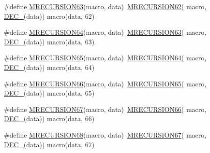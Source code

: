 \begin{DoxyCompactItemize}
\item 
\#define \mbox{\hyperlink{group__group__sam0__utils__mrecursion_gacb4f4ed0c1f5953daf02b6887354c2f4}{M\+R\+E\+C\+U\+R\+S\+I\+O\+N63}}(macro,  data)~\mbox{\hyperlink{group__group__sam0__utils__mrecursion_ga6e6d5152fa7a0cb287f6df4c79043ef1}{M\+R\+E\+C\+U\+R\+S\+I\+O\+N62}}(  macro, \mbox{\hyperlink{group__group__sam0__utils__mrecursion_ga1d23d683797679dca8c3512a54a5dcae}{D\+E\+C\+\_\+}}(data))   macro(data, 62)
\item 
\#define \mbox{\hyperlink{group__group__sam0__utils__mrecursion_gada0aad0d480e150d9fd5621e3769f397}{M\+R\+E\+C\+U\+R\+S\+I\+O\+N64}}(macro,  data)~\mbox{\hyperlink{group__group__sam0__utils__mrecursion_gacb4f4ed0c1f5953daf02b6887354c2f4}{M\+R\+E\+C\+U\+R\+S\+I\+O\+N63}}(  macro, \mbox{\hyperlink{group__group__sam0__utils__mrecursion_ga1d23d683797679dca8c3512a54a5dcae}{D\+E\+C\+\_\+}}(data))   macro(data, 63)
\item 
\#define \mbox{\hyperlink{group__group__sam0__utils__mrecursion_ga559cd98b41f57003d86b982477bad6bb}{M\+R\+E\+C\+U\+R\+S\+I\+O\+N65}}(macro,  data)~\mbox{\hyperlink{group__group__sam0__utils__mrecursion_gada0aad0d480e150d9fd5621e3769f397}{M\+R\+E\+C\+U\+R\+S\+I\+O\+N64}}(  macro, \mbox{\hyperlink{group__group__sam0__utils__mrecursion_ga1d23d683797679dca8c3512a54a5dcae}{D\+E\+C\+\_\+}}(data))   macro(data, 64)
\item 
\#define \mbox{\hyperlink{group__group__sam0__utils__mrecursion_gae1bc9072af8c0a3690822abcf9100937}{M\+R\+E\+C\+U\+R\+S\+I\+O\+N66}}(macro,  data)~\mbox{\hyperlink{group__group__sam0__utils__mrecursion_ga559cd98b41f57003d86b982477bad6bb}{M\+R\+E\+C\+U\+R\+S\+I\+O\+N65}}(  macro, \mbox{\hyperlink{group__group__sam0__utils__mrecursion_ga1d23d683797679dca8c3512a54a5dcae}{D\+E\+C\+\_\+}}(data))   macro(data, 65)
\item 
\#define \mbox{\hyperlink{group__group__sam0__utils__mrecursion_ga82481335ba51960ceed696d568754f3d}{M\+R\+E\+C\+U\+R\+S\+I\+O\+N67}}(macro,  data)~\mbox{\hyperlink{group__group__sam0__utils__mrecursion_gae1bc9072af8c0a3690822abcf9100937}{M\+R\+E\+C\+U\+R\+S\+I\+O\+N66}}(  macro, \mbox{\hyperlink{group__group__sam0__utils__mrecursion_ga1d23d683797679dca8c3512a54a5dcae}{D\+E\+C\+\_\+}}(data))   macro(data, 66)
\item 
\#define \mbox{\hyperlink{group__group__sam0__utils__mrecursion_gaa350567fcc5f153cda9d1cfcff214a99}{M\+R\+E\+C\+U\+R\+S\+I\+O\+N68}}(macro,  data)~\mbox{\hyperlink{group__group__sam0__utils__mrecursion_ga82481335ba51960ceed696d568754f3d}{M\+R\+E\+C\+U\+R\+S\+I\+O\+N67}}(  macro, \mbox{\hyperlink{group__group__sam0__utils__mrecursion_ga1d23d683797679dca8c3512a54a5dcae}{D\+E\+C\+\_\+}}(data))   macro(data, 67)

\end{DoxyCompactItemize}
